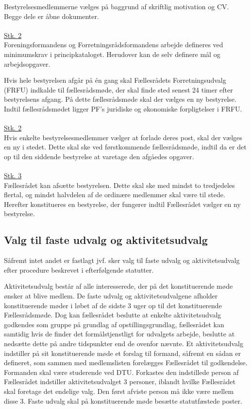 \begin{list}
\item Bestyrelsesmedlemmerne vælges på baggrund af skriftlig motivation og CV. Begge dele er åbne dokumenter.\\
\\
\underline{Stk. 2}\\
Foreningsformandens og Forretningsrådsformandens arbejde defineres ved minimumskrav i principkataloget. Herudover kan de selv definere mål og arbejdsopgaver.\\

\item Hvis hele bestyrelsen afgår på én gang skal Fællesrådets Forretningsudvalg (FRFU) indkalde til fællesrådsmøde, der skal finde sted senest 24 timer efter bestyrelsens afgang. På dette fællesrådsmøde skal der vælges en ny bestyrelse. Indtil fællesrådsmødet ligger PF's juridiske og økonomiske forpligtelser i FRFU.\\
\\
\underline{Stk. 2}\\
Hvis enkelte bestyrelsesmedlemmer vælger at forlade deres post, skal der vælges en ny i stedet. Dette skal ske ved førstkommende fællesrådsmøde, indtil da er det op til den siddende bestyrelse at varetage den afgåedes opgaver.\\
\\
\underline{Stk. 3}\\
Fællesrådet kan afsætte bestyrelsen. Dette skal ske med mindst to tredjedeles flertal, og mindst halvdelen af de ordinære medlemmer skal være til stede. Herefter konstitueres en bestyrelse, der fungerer indtil Fællesrådet vælger en ny bestyrelse.

\subsection{Valg til faste udvalg og aktivitetsudvalg} \label{kap:ValgTilUdvalg}
\item Såfremt intet andet er fastlagt jvf.  sker valg til faste udvalg og aktivitetsudvalg efter procedure beskrevet i efterfølgende statutter.\\

\item Aktivitetsudvalg består af alle interesserede, der på det konstituerende møde ønsker at blive medlem. De faste udvalg og aktivitetsudvalgene afholder konstituerende møder i løbet af de sidste 3 uger op til det konstituerende Fællesrådsmøde. Dog kan fællesrådet beslutte at enkelte aktivitetsudvalg godkendes som gruppe på grundlag af opstillingsgrundlag, fællesrådet kan samtidig hvis de finder det formålstjenstligt for udvalgets arbejde, beslutte at nedsætte dette på andre tidspunkter end de ovenfor nævnte. Et aktivitetsudvalg indstiller på sit konstituerende møde et forslag til formand, såfremt en sådan er defineret, som sammen med medlemslisten forelægges Fællesrådet til godkendelse. Formanden skal være studerende ved DTU. Forkastes den indstillede person af Fællesrådet indstiller aktivitetsudvalget 3 personer, iblandt hvilke Fællesrådet skal foretage det endelige valg. Den først afviste person må ikke være mellem disse 3. Faste udvalg skal på konstituerende møde besætte statutfæstede poster.


\end{list}

